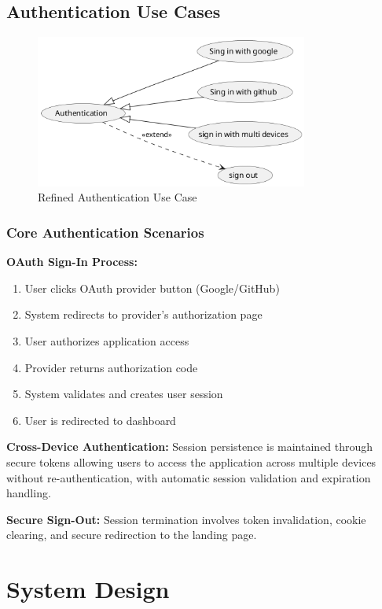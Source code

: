 \subsection{Authentication Use Cases}
\begin{figure}[H]
    \centering
    \includegraphics[width=0.8\textwidth]{conception/SprintII/use_case_diagrams/refined_use_case_feature_auth.png}
    \caption{Refined Authentication Use Case}
    \label{fig:refined_auth_usecase}
\end{figure}

\subsubsection{Core Authentication Scenarios}

\textbf{OAuth Sign-In Process:}
\begin{enumerate}
    \item User clicks OAuth provider button (Google/GitHub)
    \item System redirects to provider's authorization page
    \item User authorizes application access
    \item Provider returns authorization code
    \item System validates and creates user session
    \item User is redirected to dashboard
\end{enumerate}

\textbf{Cross-Device Authentication:}
Session persistence is maintained through secure tokens allowing users to access the application across multiple devices without re-authentication, with automatic session validation and expiration handling.

\textbf{Secure Sign-Out:}
Session termination involves token invalidation, cookie clearing, and secure redirection to the landing page.

\section{System Design}

